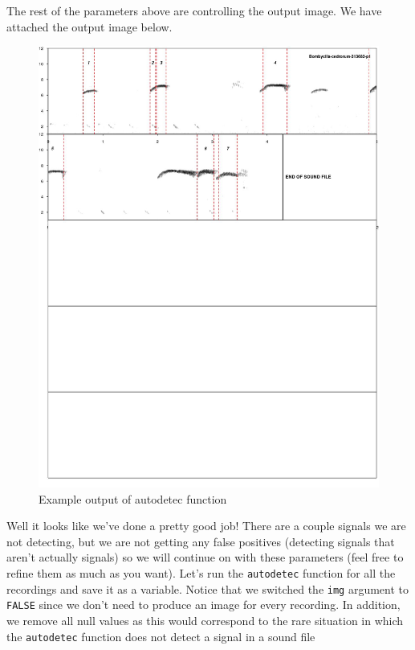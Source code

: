 \documentclass[12pt,oneside]{book}\usepackage[]{graphicx}\usepackage[]{color}
\begin{document}
{{{{The rest of the parameters above are controlling the output image. We have attached the output image below. 

\begin{figure}[htbp]
\includegraphics[width=6in]{14-signalProcessing/14-images/sampleAutodetec.jpg}
\caption{Example output of autodetec function}
\label{FIG:AUTODETEC}
\end{figure}

Well it looks like we've done a pretty good job! There are a couple signals we are not detecting, but we are not getting any false positives (detecting signals that aren't actually signals) so we will continue on with these parameters (feel free to refine them as much as you want). Let's run the \verb+autodetec+ function for all the recordings and save it as a variable. Notice that we switched the \verb+img+ argument to \verb+FALSE+ since we don't need to produce an image for every recording.  In addition, we remove all null values as this would correspond to the rare situation in which the \verb+autodetec+ function does not detect a signal in a sound file

}}}}
\end{document}
